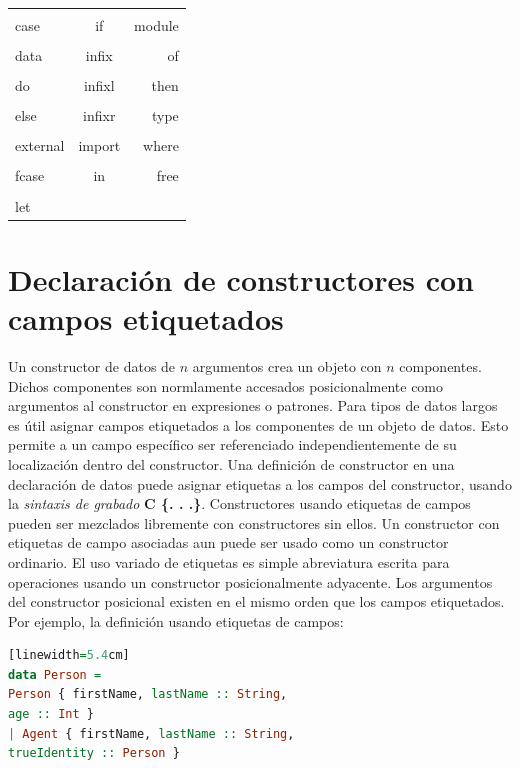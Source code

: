 \documentclass[10pt,journal,compsoc]{IEEEtran}
\begin{document}
\begin{center}
\begin{tabular}{| l | c | r |} 
	\hline \\
	case & if & module \\
	\hline \\
	data & infix & of \\
	\hline \\
	do & infixl & then \\
	\hline \\
	else & infixr & type \\
	\hline \\ 
	external & import & where \\
	\hline \\
	fcase & in & free \\ 
	\hline \\
	let \\
	\hline
	
\end{tabular} 
\end{center}


\section{Declaraci\'on de constructores con campos etiquetados}
Un constructor de datos de $n$ argumentos crea un objeto con $n$ componentes. Dichos componentes son normlamente accesados posicionalmente como argumentos al constructor en expresiones o patrones. Para tipos de datos largos es \'util asignar campos etiquetados a los componentes de un objeto de datos. Esto permite a un campo espec\'ifico ser referenciado independientemente de su localizaci\'on dentro del constructor. Una definici\'on de constructor en una declaraci\'on de datos puede asignar etiquetas a los campos del constructor, usando la \emph{sintaxis de grabado} \textbf{C \{. . .\}}. Constructores usando etiquetas de campos pueden ser mezclados libremente con constructores sin ellos. Un constructor con etiquetas de campo asociadas aun puede ser usado como un constructor ordinario. El uso variado de etiquetas es simple abreviatura escrita para operaciones usando un constructor posicionalmente adyacente. Los argumentos del constructor posicional existen en el mismo orden que los campos etiquetados. \\
Por ejemplo, la definici\'on usando etiquetas de campos: 

\begin{lstlisting}[language=Haskell, caption = {Definici\'on usando etiquetas de campos }][linewidth=5.4cm]
data Person = 
Person { firstName, lastName :: String, 
age :: Int }
| Agent { firstName, lastName :: String, 
trueIdentity :: Person }
\end{lstlisting}
\end{document}
